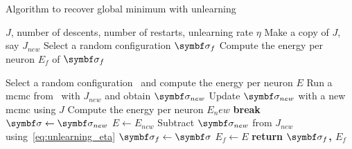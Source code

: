 \documentclass[\rootdir/main.tex]{subfiles}
\begin{document}
\begin{algorithm}
    \caption{Algorithm to recover global minimum with unlearning}
    \label{alg:unlearning}
    \begin{algorithmic}[1]
        \Require $J$, number of descents, number of restarts, unlearning rate $\eta$
        \State Make a copy of $J$, say $J_{new}$
        \State Select a random configuration $\bsigma_{f}$
        \State Compute the energy per neuron $E_f$ of $\bsigma_{f}$

            \State Select a random configuration \bsigma\ and compute the energy per neuron $E$
                \State Run a \acrshort{mcmc} from \bsigma\ with $J_{new}$ and obtain $\bsigma_{new}$
                \State Update $\bsigma_{new}$ with a new \acrshort{mcmc} using $J$
                \State Compute the energy per neuron $E_new$
                    \State \textbf{break}
                \EndIf
                \State $\bsigma \gets \bsigma_{new}$
                \State $E \gets E_{new}$
                \State Subtract $\bsigma_{new}$ from $J_{new}$ using~\cref{eq:unlearning_eta}
            \EndFor
                \State $\bsigma_f \gets \bsigma$
                \State $E_f \gets E$
            \EndIf
        \EndFor
        \State \textbf{return $\bsigma_f$, $E_f$}
    \end{algorithmic}
    \end{algorithm}
\end{document}
